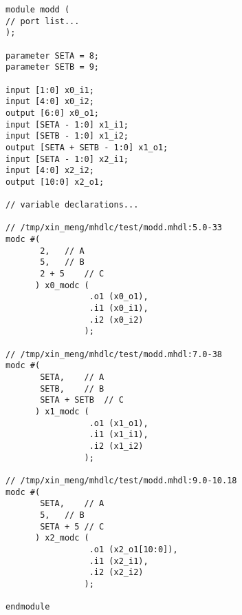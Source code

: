 \begin{minipage}[t]{.45\textwidth}
\begin{lstlisting}[caption={SV Instantiation}, label={lst:modd in sv}]
module modd ( 
// port list...
);

parameter SETA = 8;
parameter SETB = 9;

input [1:0] x0_i1;
input [4:0] x0_i2;
output [6:0] x0_o1;
input [SETA - 1:0] x1_i1;
input [SETB - 1:0] x1_i2;
output [SETA + SETB - 1:0] x1_o1;
input [SETA - 1:0] x2_i1;
input [4:0] x2_i2;
output [10:0] x2_o1;

// variable declarations...

// /tmp/xin_meng/mhdlc/test/modd.mhdl:5.0-33
modc #(
       2,	// A
       5,	// B
       2 + 5	// C
      ) x0_modc (
                 .o1 (x0_o1),
                 .i1 (x0_i1),
                 .i2 (x0_i2)
                );

// /tmp/xin_meng/mhdlc/test/modd.mhdl:7.0-38
modc #(
       SETA,	// A
       SETB,	// B
       SETA + SETB	// C
      ) x1_modc (
                 .o1 (x1_o1),
                 .i1 (x1_i1),
                 .i2 (x1_i2)
                );

// /tmp/xin_meng/mhdlc/test/modd.mhdl:9.0-10.18
modc #(
       SETA,	// A
       5,	// B
       SETA + 5	// C
      ) x2_modc (
                 .o1 (x2_o1[10:0]),
                 .i1 (x2_i1),
                 .i2 (x2_i2)
                );

endmodule
\end{lstlisting}
\end{minipage}


